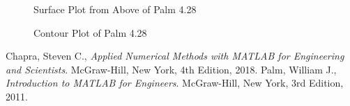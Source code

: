 \documentclass{article}
\begin{document}
\begin{figure}[htb!p]
\begin{center}
\caption{Surface Plot from Above of Palm 4.28}
\end{center}
\end{figure}

\begin{figure}[htb!p]
\begin{center}
\caption{Contour Plot of Palm 4.28}
\end{center}
\end{figure}
\clearpage

\begin{thebibliography}{9}
  Chapra, Steven C.,
  {\it Applied Numerical Methods with MATLAB for Engineering and Scientists}.
  McGraw-Hill, New York,
  4th Edition,
  2018.
  Palm, William J.,
  {\it Introduction to MATLAB for Engineers}.
  McGraw-Hill, New York,
  3rd Edition,
  2011.
\end{thebibliography}
\end{document}

